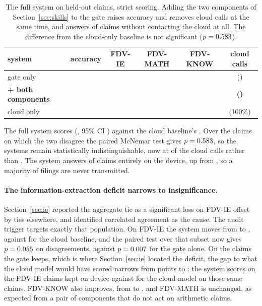 \documentclass{article}
\begin{document}
\begin{table}[t]
\caption{The full system on \nTest{} held-out claims, strict scoring. Adding the two
components of Section~\ref{sec:skills} to the gate raises accuracy and removes cloud calls
at the same time, and answers \fullOnDeviceRate{} of claims without contacting the cloud at
all. The difference from the cloud-only baseline is not significant
($p = 0.583{}$).}
\label{tab:full}
\centering
\begin{tabular}{lccccc}
\toprule
system & accuracy & FDV-IE & FDV-MATH & FDV-KNOW & cloud calls \\
\midrule
gate only                   & \accRouted{} & \accRoutedIE{} & \accRoutedMATH{} & \accRoutedKNOW{} & \cloudCalls{} (\escRate{}) \\
\textbf{+ both components}  & \textbf{\accFull{}} & \textbf{\accFullIE{}} & \textbf{\accFullMATH{}} & \textbf{\accFullKNOW{}} & \textbf{\fullCloudCalls{} (\fullEscRate{})} \\
cloud only                  & \accCloud{} & \accCloudIE{} & \accCloudMATH{} & \accCloudKNOW{} & \nTest{} (100\%) \\
\bottomrule
\end{tabular}
\end{table}

The full system scores \accFull{} (\accFullcount{}, 95\% CI \accFullci{}) against the cloud
baseline's \accCloud{}. Over the \mcnemarFullDisagree{} claims on which the two disagree the
paired McNemar test gives $p = 0.583{}$, so the systems remain statistically
indistinguishable, now at \fullEscRate{} of the cloud calls rather than \escRate{}. The
system answers \fullOnDeviceRate{} of claims entirely on the device, up from
\onDeviceRate{}, so a majority of filings are never transmitted.

\paragraph{The information-extraction deficit narrows to insignificance.}
Section~\ref{sec:ie} reported the aggregate tie as a significant loss on FDV-IE offset by
ties elsewhere, and identified correlated agreement as the cause. The audit trigger targets
exactly that population. On FDV-IE the system moves from \accRoutedIE{} to \accFullIE{},
against \accCloudIE{} for the cloud baseline, and the paired test over that subset now gives
$p = 0.055{}$ on \mcnemarFullIEDisagree{} disagreements, against
$p = 0.007{}$ for the gate alone. On the claims the gate keeps, which is where
Section~\ref{sec:ie} located the deficit, the gap to what the cloud model would have scored
narrows from \keptLocalIEGap{} points to \fullKeptLocalIEGap{}: the system scores
\fullKeptLocalIERouted{} on the \fullKeptLocalIEn{} FDV-IE claims kept on device against
\fullKeptLocalIECloud{} for the cloud model on those same claims. FDV-KNOW also improves,
from \accRoutedKNOW{} to \accFullKNOW{}, and FDV-MATH is unchanged, as expected from a pair
of components that do not act on arithmetic claims.
\end{document}
